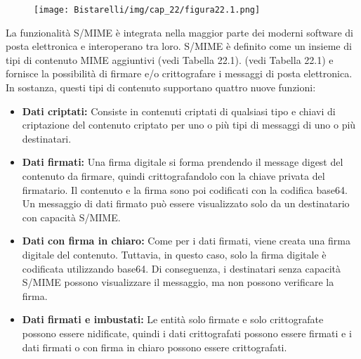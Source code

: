 \begin{figure}[H]
	\centering
    \texttt{[image: Bistarelli/img/cap\_22/figura22.1.png]}
\end{figure}

La funzionalità S/MIME è integrata nella maggior parte dei moderni software di posta elettronica e interoperano tra loro. S/MIME è definito come un insieme di tipi di contenuto MIME aggiuntivi (vedi Tabella 22.1).
(vedi Tabella 22.1) e fornisce la possibilità di firmare e/o crittografare i messaggi di posta elettronica. In sostanza, questi tipi di contenuto supportano quattro nuove funzioni:
\begin{itemize}
    \item \textbf{Dati criptati:} Consiste in contenuti criptati di qualsiasi tipo e chiavi di criptazione del contenuto criptato per uno o più tipi di messaggi di uno o più destinatari.
    
    \item \textbf{Dati firmati:} Una firma digitale si forma prendendo il message digest del contenuto da firmare, quindi crittografandolo con la chiave privata del firmatario. Il contenuto e la firma sono poi codificati con la codifica base64. Un messaggio di dati firmato può essere visualizzato solo da un destinatario con capacità S/MIME.
    
    \item \textbf{Dati con firma in chiaro:} Come per i dati firmati, viene creata una firma digitale del contenuto. Tuttavia, in questo caso, solo la firma digitale è codificata utilizzando base64. Di conseguenza, i destinatari senza capacità S/MIME possono visualizzare il messaggio, ma non possono verificare la firma.
    
    \item \textbf{Dati firmati e imbustati:} Le entità solo firmate e solo crittografate possono essere nidificate, quindi i dati crittografati possono essere firmati e i dati firmati o con firma in chiaro possono essere crittografati.
\end{itemize}

